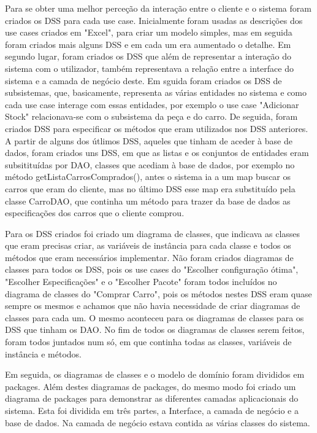 \documentclass[10pt, a4paper]{article}
\begin{document}
Para se obter uma melhor perceção da interação entre o cliente e o sistema foram criados os DSS para cada use case. Inicialmente foram usadas as descrições dos use cases criados em "Excel", para criar um modelo simples, mas em seguida foram criados mais alguns DSS e em cada um era aumentado o detalhe. Em segundo lugar, foram criados os DSS que além de representar a interação do sistema com o utilizador, também representava a relação entre a interface do sistema e a camada de negócio deste. Em sguida foram criados os DSS de subsistemas, que, basicamente, representa as várias entidades no sistema e como cada use case interage com essas entidades, por exemplo o use case "Adicionar Stock" relacionava-se com o subsistema da peça e do carro. De seguida, foram criados DSS para especificar os métodos que eram utilizados nos DSS anteriores. A partir de alguns dos útlimos DSS, aqueles que tinham de aceder à base de dados, foram criados uns DSS, em que as listas e os conjuntos de entidades eram subsitituídas por DAO, classes que acediam à base de dados, por exemplo no método getListaCarrosComprados(), antes o sistema ia a um map buscar os carros que eram do cliente, mas no último DSS esse map era substituído pela classe CarroDAO, que continha um método para trazer da base de dados as especificações dos carros que o cliente comprou.

Para os DSS criados foi criado um diagrama de classes, que indicava as classes que eram precisas criar, as variáveis de instância para cada classe e todos os métodos que eram necessários implementar. Não foram criados diagramas de classes para todos os DSS, pois os use cases do "Escolher configuração ótima", "Escolher Especificações" e o "Escolher Pacote" foram todos incluídos no diagrama de classes do "Comprar Carro", pois os métodos nestes DSS eram quase sempre os mesmos e achamos que não havia necessidade de criar diagramas de classes para cada um. O mesmo aconteceu para os diagramas de classes para os DSS que tinham os DAO.
No fim de todos os diagramas de classes serem feitos, foram todos juntados num só, em que continha todas as classes, variáveis de instância e métodos.

Em seguida, os diagramas de classes e o modelo de domínio foram divididos em packages. Além destes diagramas de packages, do mesmo modo foi criado um diagrama de packages para demonstrar as diferentes camadas aplicacionais do sistema. Esta foi dividida em três partes, a Interface, a camada de negócio e a base de dados. Na camada de negócio estava contida as várias classes do sistema.
\end{document}
